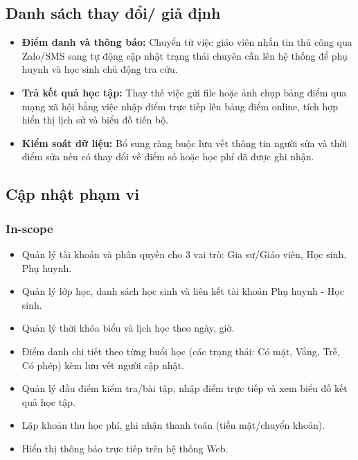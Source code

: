 \subsection{Danh sách thay đổi/ giả định}
\begin{itemize}
    \item \textbf{Điểm danh và thông báo:} Chuyển từ việc giáo viên nhắn tin thủ công qua Zalo/SMS sang tự động cập nhật trạng thái chuyên cần lên hệ thống để phụ huynh và học sinh chủ động tra cứu.
    \item \textbf{Trả kết quả học tập:} Thay thế việc gửi file hoặc ảnh chụp bảng điểm qua mạng xã hội bằng việc nhập điểm trực tiếp lên bảng điểm online, tích hợp hiển thị lịch sử và biểu đồ tiến bộ.
    \item \textbf{Kiểm soát dữ liệu:} Bổ sung ràng buộc lưu vết thông tin người sửa và thời điểm sửa nếu có thay đổi về điểm số hoặc học phí đã được ghi nhận.
\end{itemize}

\subsection{Cập nhật phạm vi}
\subsubsection{In-scope}
\begin{itemize}
    \item Quản lý tài khoản và phân quyền cho 3 vai trò: Gia sư/Giáo viên, Học sinh, Phụ huynh.
    \item Quản lý lớp học, danh sách học sinh và liên kết tài khoản Phụ huynh - Học sinh.
    \item Quản lý thời khóa biểu và lịch học theo ngày, giờ.
    \item Điểm danh chi tiết theo từng buổi học (các trạng thái: Có mặt, Vắng, Trễ, Có phép) kèm lưu vết người cập nhật.
    \item Quản lý đầu điểm kiểm tra/bài tập, nhập điểm trực tiếp và xem biểu đồ kết quả học tập.
    \item Lập khoản thu học phí, ghi nhận thanh toán (tiền mặt/chuyển khoản).
    \item Hiển thị thông báo trực tiếp trên hệ thống Web.
\end{itemize}
